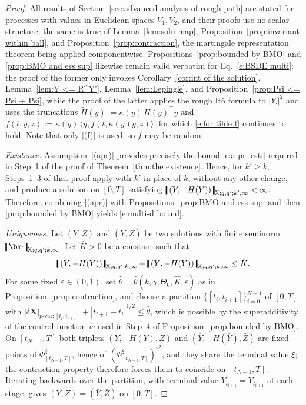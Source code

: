 \documentclass[11pt,reqno]{amsart}
\numberwithin{equation}{section}
\newcommand{\shortthickbar}{%
  \vcenter{\hbox{\rule{1.8pt}{2.2ex}}}%
}
\newcommand{\thicknm}[1]{%
  \mathopen{\shortthickbar}%
  \mkern4mu #1 \mkern4mu%
  \mathclose{\shortthickbar}%
}
\begin{document}
\begin{proof}
All results of Section~\ref{sec:advanced analysis of rough path} are stated for processes with values in Euclidean spaces $V_1, V_2$, and their proofs use no scalar structure; the same is true of Lemma~\ref{lem:solu map}, Proposition~\ref{prop:invariant within ball}, and Proposition~\ref{prop:contraction}, the martingale representation theorem being applied componentwise. Propositions~\ref{prop:bounded by BMO} and \ref{prop:BMO and ess sup} likewise remain valid verbatim for Eq.~\eqref{e:BSDE multi}: the proof of the former only invokes Corollary~\ref{cor:int of the solution}, Lemma~\ref{lem:Y <= R^Y'}, Lemma~\ref{lem:Lepingle}, and Proposition~\ref{prop:Psi <= Psi + Psi}, while the proof of the latter applies the rough It\^o formula to $|Y_{\bm\cdot}|^2$ and uses the truncations $\tilde H(y) := \kappa(y)\, H(y)^{\top} y$ and $\tilde f(t,y,z) := \kappa(y)\, \langle y, f(t,\kappa(y)y,z)\rangle$, for which \eqref{e:for tilde f} continues to hold. Note that only \ref{(f)} is used, so $f$ may be random.

\emph{Existence.} 
Assumption~\ref{(apr)} provides precisely the bound \eqref{e:a pri esti} required in Step~1 of the proof of Theorem~\ref{thm:the existence}. Hence, for $k' \ge k$, Steps~1--3 of that proof apply with $k'$ in place of $k$, without any other change, and produce a solution on $[0,T]$ satisfying $\thicknm{(Y,-H(Y))}_{\mathrm X;q,q';k',\infty} < \infty$. Therefore, combining \ref{(apr)} with Propositions~\ref{prop:BMO and ess sup} and then \ref{prop:bounded by BMO} yields \eqref{e:multi-d bound}. 

\emph{Uniqueness.} 
Let $(Y,Z)$ and $(\bar Y,\bar Z)$ be two solutions with finite seminorm $\thicknm{\bm\cdot}_{\mathrm X;q,q';k,\infty}$. Let $\hat K>0$ be a constant such that 
\begin{equation*}
\thicknm{(Y,-H(Y))}_{\mathrm X;q,q';k,\infty} + \thicknm{(\bar Y,-H(\bar Y))}_{\mathrm X;q,q';k,\infty} \le \hat K.
\end{equation*}
For some fixed $\varepsilon \in (0,1)$, set $\hat \theta = \hat\theta(k,\gamma,\Theta_0,\hat K,\varepsilon)$ as in Proposition~\ref{prop:contraction}, and choose a partition $\{[t_i,t_{i+1}]\}_{i=0}^{N-1}$ of $[0,T]$ with $|\delta \mathbf X|_{p\text{-}\mathrm{var};[t_i,t_{i+1}]} + |t_{i+1}-t_i|^{1/2} \le \hat\theta$, which is possible by the superadditivity of the control function $\hat w$ used in Step~4 of Proposition~\ref{prop:bounded by BMO}. 
On $[t_{N-1},T]$ both triplets $(Y,-H(Y),Z)$ and $(\bar Y,-H(\bar Y),\bar Z)$ are fixed points of $\Phi^{\xi}_{[t_{N-1},T]}$, hence of $(\Phi^{\xi}_{[t_{N-1},T]})^{\circ 2}$, and they share the terminal value $\xi$; the contraction property therefore forces them to coincide on $[t_{N-1},T]$. Iterating backwards over the partition, with terminal value $Y_{t_{i+1}} = \bar Y_{t_{i+1}}$ at each stage, gives $(Y,Z) = (\bar Y, \bar Z)$ on $[0,T]$. 
\end{proof}
\end{document}
